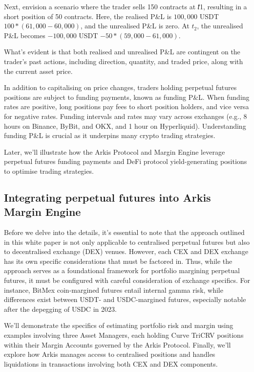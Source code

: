 \documentclass[conference]{IEEEtran}
\begin{document}
Next, envision a scenario where the trader sells 150 contracts at 𝑡1, resulting in a short position of 50 contracts. Here, the realised P\&L is $100,000$ USDT $100 * (61,000 - 60,000)$, and the unrealised P\&L is zero. At $t_{2}$, the unrealised P\&L becomes $-100,000$ USDT $-50 * (59,000 - 61,000)$.

What’s evident is that both realised and unrealised P\&L are contingent on the trader's past actions, including direction, quantity, and traded price, along with the current asset price.

In addition to capitalising on price changes, traders holding perpetual futures positions are subject to funding payments, known as funding P\&L. When funding rates are positive, long positions pay fees to short position holders, and vice versa for negative rates. Funding intervals and rates may vary across exchanges (e.g., 8 hours on Binance, ByBit, and OKX, and 1 hour on Hyperliquid). Understanding funding P\&L is crucial as it underpins many crypto trading strategies.

Later, we'll illustrate how the Arkis Protocol and Margin Engine leverage perpetual futures funding payments and DeFi protocol yield-generating positions to optimise trading strategies.

\subsection{Integrating perpetual futures into Arkis Margin Engine}
Before we delve into the details, it's essential to note that the approach outlined in this white paper is not only applicable to centralised perpetual futures but also to decentralised exchange (DEX) venues. However, each CEX and DEX exchange has its own specific considerations that must be factored in. Thus, while the approach serves as a foundational framework for portfolio margining perpetual futures, it must be configured with careful consideration of exchange specifics. For instance, BitMex coin-margined futures entail internal gamma risk, while differences exist between USDT- and USDC-margined futures, especially notable after the depegging of USDC in 2023.

We'll demonstrate the specifics of estimating portfolio risk and margin using examples involving three Asset Managers, each holding Curve TriCRV positions within their Margin Accounts governed by the Arkis Protocol. Finally, we'll explore how Arkis manages access to centralised positions and handles liquidations in transactions involving both CEX and DEX components.
\end{document}
